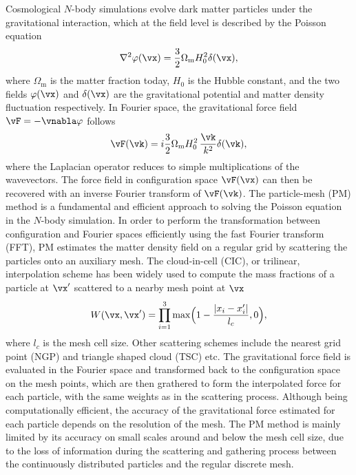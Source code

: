 \documentclass[modern, trackchanges, dvipsnames]{aastex631}
\newcommand{\Omegam}{\Omega_\mathrm{m}}
\begin{document}
Cosmological $N$-body simulations evolve dark matter particles under the
gravitational interaction, which at the field level is described by the
Poisson equation
%
\begin{equation}
  \nabla^2 \varphi(\vx) = \frac32 \Omegam H_0^2 \delta(\vx),
\end{equation}
%
where $\Omegam$ is the matter fraction today, $H_0$ is the Hubble
constant, and the two fields $\varphi(\vx)$ and $\delta(\vx)$ are the
gravitational potential and matter density fluctuation respectively.
In Fourier space, the gravitational force field $\vF = - \vnabla
\varphi$ follows
%
\begin{equation}
\vF(\vk) = i \frac32 \Omegam H_0^2 \,\frac{\vk}{k^2} \delta(\vk),
\label{force}
\end{equation}
%
where the Laplacian operator reduces to simple multiplications of the
wavevectors.
The force field in configuration space $\vF(\vx)$ can then be recovered
with an inverse Fourier transform of $\vF(\vk)$.
The particle-mesh (PM) method is a fundamental and efficient approach to
solving the Poisson equation in the $N$-body simulation.
In order to perform the transformation between configuration and Fourier
spaces efficiently using the fast Fourier transform (FFT), PM estimates
the matter density field on a regular grid by scattering the particles
onto an auxiliary mesh.
The cloud-in-cell (CIC), or trilinear, interpolation scheme
\citep{HockneyEastwood1988} has been widely used to compute the mass
fractions of a particle at $\vx'$ scattered to a nearby mesh point
at $\vx$
%
\begin{equation}
  W(\vx, \vx') = \prod_{i=1}^3
    \max \Bigl( 1 - \frac{|x_i-x'_i|}{l_c}, 0 \Bigr),
  \label{cic}
  \end{equation}
%
where $l_c$ is the mesh cell size.
Other scattering schemes include the nearest grid point (NGP) and
triangle shaped cloud (TSC) etc.
The gravitational force field is evaluated in the Fourier space and
transformed back to the configuration space on the mesh points, which
are then grathered to form the interpolated force for each particle,
with the same weights as in the scattering process.
Although being computationally efficient, the accuracy of the
gravitational force estimated for each particle depends on the
resolution of the mesh.
The PM method is mainly limited by its accuracy on small scales around
and below the mesh cell size, due to the loss of information during the
scattering and gathering process between the continuously distributed
particles and the regular discrete mesh.
\end{document}
